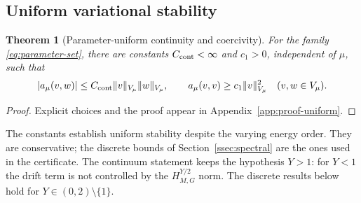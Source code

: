 \documentclass[11pt]{amsart}
\newtheorem{theorem}{Theorem}[section]
\theoremstyle{remark}
\begin{document}
\subsection{Uniform variational stability}
\label{ssec:uniform}
\begin{theorem}[Parameter-uniform continuity and coercivity]
\label{thm:uniform-coercivity}
For the family \eqref{eq:parameter-set}, there are constants
$C_{\rm cont}<\infty$ and $c_1>0$, independent of $\mu$, such that
\begin{equation}
 |a_\mu(v,w)|\le C_{\rm cont}\|v\|_{V_\mu}\|w\|_{V_\mu},
 \qquad a_\mu(v,v)\ge c_1\|v\|_{V_\mu}^2
 \quad(v,w\in V_\mu).
 \label{eq:uniform-coercivity}
\end{equation}
\end{theorem}
\begin{proof}
Explicit choices and the proof appear in Appendix~\ref{app:proof-uniform}.
\end{proof}
The constants establish uniform stability despite the varying energy order.
They are conservative; the discrete bounds of Section~\ref{ssec:spectral} are the ones used
in the certificate.  The continuum statement keeps the hypothesis $Y>1$: for $Y<1$ the drift
term is not controlled by the $H^{Y/2}_{M,G}$ norm.  The discrete results below hold for
$Y\in(0,2)\setminus\{1\}$.

\end{document}
